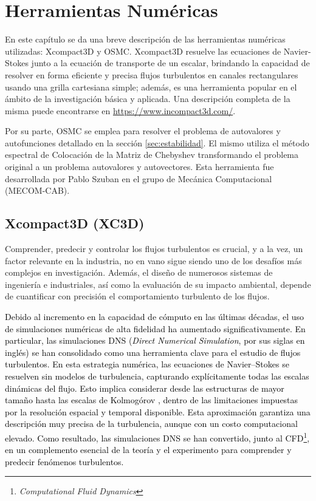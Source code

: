 
\chapter{Herramientas Numéricas} \label{cap:numerico}

En este capítulo se da una breve descripción de las herramientas numéricas utilizadas: Xcompact3D y OSMC. Xcompact3D resuelve las ecuaciones de Navier-Stokes junto a la ecuación de transporte de un escalar, brindando la capacidad de resolver en forma eficiente y precisa flujos turbulentos en canales rectangulares usando una grilla cartesiana simple; además, es una herramienta popular en el ámbito de la investigación básica y aplicada. Una descripción completa de la misma puede encontrarse en \url{https://www.incompact3d.com/}.

Por su parte, OSMC se emplea para resolver el problema de autovalores y autofunciones detallado en la sección \ref{sec:estabilidad}. El mismo utiliza el método espectral de Colocación de la Matriz de Chebyshev transformando el problema original a un problema autovalores y autovectores. Esta herramienta fue desarrollada por Pablo Szuban \cite{szuban2023} en el grupo de Mecánica Computacional (MECOM-CAB). 


\section{Xcompact3D (XC3D)}

Comprender, predecir y controlar los flujos turbulentos es crucial, y a la vez, un factor relevante en la industria, no en vano sigue siendo uno de los desafíos más complejos en investigación. Además, el diseño de numerosos sistemas de ingeniería e industriales, así como la evaluación de su impacto ambiental, depende de cuantificar con precisión el comportamiento turbulento de los flujos.

\textcolor{black}{Debido al incremento en la capacidad de cómputo en las últimas décadas, el uso de \linebreak simulaciones numéricas de alta fidelidad ha aumentado significativamente. En particular, \linebreak las simulaciones DNS (\textit{Direct Numerical Simulation}, por sus siglas en inglés) se han consolidado como una herramienta clave para el estudio de flujos turbulentos. En esta estrategia numérica, las ecuaciones de Navier–Stokes se resuelven sin modelos de turbulencia, capturando explícitamente todas las escalas dinámicas del flujo. Esto implica considerar desde las estructuras de mayor tamaño hasta las escalas de Kolmogórov \cite{pope2001turbulent}, dentro de las limitaciones impuestas por la resolución espacial y temporal disponible. Esta aproximación garantiza una descripción muy precisa de la turbulencia, aunque con un costo computacional elevado. Como resultado, las simulaciones DNS se han convertido, junto al CFD\footnote{\textit{Computational Fluid Dynamics}}, en un complemento esencial de la teoría y el experimento para comprender y predecir fenómenos turbulentos.}


